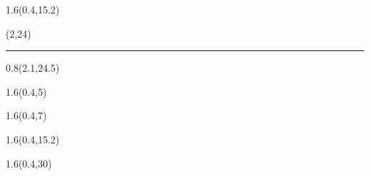 \begin{frame}[plain]
  \begin{textblock*}{1.6\TPHorizModule}(0.4\TPHorizModule,15.2\TPVertModule)
    \titlefmt
  \end{textblock*}

  \begin{textblock*}{\TPHorizModule}(2\TPHorizModule,24\TPVertModule)
    \textcolor{white}{\rule{\linewidth}{2\TPVertModule}}
  \end{textblock*}

  \begin{textblock*}{0.8\TPHorizModule}(2.1\TPHorizModule,24.5\TPVertModule)
    \subtitlefmt
  \end{textblock*}
\end{frame}


\begin{frame}[plain]
  \begin{textblock*}{1.6\TPHorizModule}(0.4\TPHorizModule,5\TPVertModule)
    \authorfmt
  \end{textblock*}

  \begin{textblock*}{1.6\TPHorizModule}(0.4\TPHorizModule,7\TPVertModule)
    \affiliation
  \end{textblock*}

  \begin{textblock*}{1.6\TPHorizModule}(0.4\TPHorizModule,15.2\TPVertModule)
    \titlefmt
  \end{textblock*}

  \begin{textblock*}{1.6\TPHorizModule}(0.4\TPHorizModule,30\TPVertModule)
    \edition
  \end{textblock*}
\end{frame}
\endgroup


